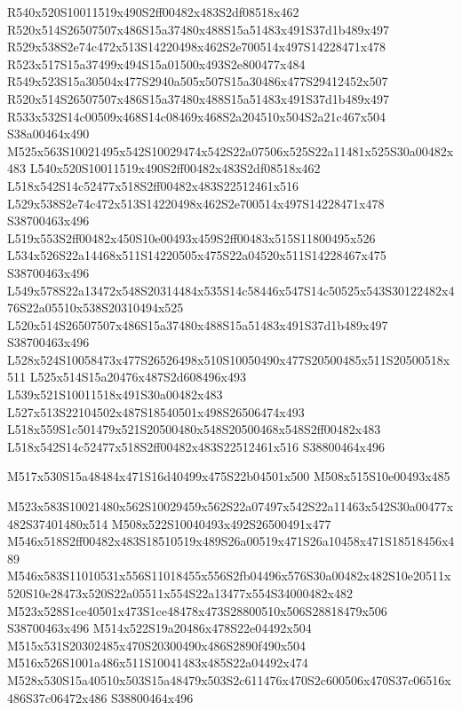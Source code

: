 \documentclass{article}
\begin{document}
\begin{multicols}{2}
R540x520S10011519x490S2ff00482x483S2df08518x462 R520x514S26507507x486S15a37480x488S15a51483x491S37d1b489x497 R529x538S2e74c472x513S14220498x462S2e700514x497S14228471x478 R523x517S15a37499x494S15a01500x493S2e800477x484 R549x523S15a30504x477S2940a505x507S15a30486x477S29412452x507 R520x514S26507507x486S15a37480x488S15a51483x491S37d1b489x497 R533x532S14c00509x468S14c08469x468S2a204510x504S2a21c467x504 S38a00464x490 M525x563S10021495x542S10029474x542S22a07506x525S22a11481x525S30a00482x483 L540x520S10011519x490S2ff00482x483S2df08518x462 L518x542S14c52477x518S2ff00482x483S22512461x516 L529x538S2e74c472x513S14220498x462S2e700514x497S14228471x478 S38700463x496 L519x553S2ff00482x450S10e00493x459S2ff00483x515S11800495x526 L534x526S22a14468x511S14220505x475S22a04520x511S14228467x475 S38700463x496 L549x578S22a13472x548S20314484x535S14c58446x547S14c50525x543S30122482x476S22a05510x538S20310494x525 L520x514S26507507x486S15a37480x488S15a51483x491S37d1b489x497 S38700463x496 L528x524S10058473x477S26526498x510S10050490x477S20500485x511S20500518x511 L525x514S15a20476x487S2d608496x493 L539x521S10011518x491S30a00482x483 L527x513S22104502x487S18540501x498S26506474x493 L518x559S1c501479x521S20500480x548S20500468x548S2ff00482x483 L518x542S14c52477x518S2ff00482x483S22512461x516 S38800464x496


\begin{center}
M517x530S15a48484x471S16d40499x475S22b04501x500 M508x515S10e00493x485 
\end{center}


M523x583S10021480x562S10029459x562S22a07497x542S22a11463x542S30a00477x482S37401480x514 M508x522S10040493x492S26500491x477 M546x518S2ff00482x483S18510519x489S26a00519x471S26a10458x471S18518456x489 M546x583S11010531x556S11018455x556S2fb04496x576S30a00482x482S10e20511x520S10e28473x520S22a05511x554S22a13477x554S34000482x482 M523x528S1ce40501x473S1ce48478x473S28800510x506S28818479x506 S38700463x496 M514x522S19a20486x478S22e04492x504 M515x531S20302485x470S20300490x486S2890f490x504 M516x526S1001a486x511S10041483x485S22a04492x474 M528x530S15a40510x503S15a48479x503S2c611476x470S2c600506x470S37c06516x486S37c06472x486 S38800464x496


\end{multicols}
\end{document}
